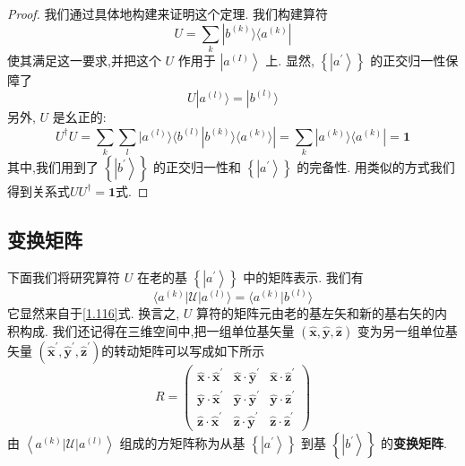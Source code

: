 \documentclass[lang=cn,newtx,10pt,scheme=chinese,thmcnt=section]{elegantbook}
\begin{document}
\begin{proof}
	我们通过具体地构建来证明这个定理. 我们构建算符
	\begin{equation}\label{1.115}
		U = \mathop{\sum }\limits_{k}| {b}^{( k) }\rangle \langle {a}^{( k) }|
	\end{equation}
	使其满足这一要求,并把这个 $U$ 作用于 $\left| {a}^{\left( I\right) }\right\rangle$ 上. 显然, $\left\{ \left| {a}^{\prime }\right\rangle \right\}$ 的正交归一性保障了
	\begin{equation}\label{1.116}
		U| {a}^{( l) }\rangle = | {b}^{( l) }\rangle
	\end{equation}
	另外, $U$ 是幺正的:
	\begin{equation}
		{U}^{ \dagger }U = \mathop{\sum }\limits_{k}\mathop{\sum }\limits_{l}| {a}^{( l) }\rangle \langle {{b}^{( l) }| {{b}^{( k) }\rangle \langle {a}^{( k) }\rangle }| = \mathop{\sum }\limits_{k}| {a}^{( k) }\rangle \langle {a}^{( k) }| = \textbf{1}}
	\end{equation}
	其中,我们用到了 $\left\{ \left| {b}^{\prime }\right\rangle \right\}$ 的正交归一性和 $\left\{ \left| {a}^{\prime }\right\rangle \right\}$ 的完备性. 用类似的方式我们得到关系式$U{U}^{ \dagger } = \textbf{1}$式.
\end{proof}
\subsection*{变换矩阵}
下面我们将研究算符 $U$ 在老的基 $\left\{ \left| {a}^{\prime }\right\rangle \right\}$ 中的矩阵表示. 我们有
\begin{equation}
	\langle {{a}^{\left( k\right) }\left| \mathcal{U}\right| {a}^{\left( l\right) }}\rangle = \langle {{a}^{\left( k\right) } | {b}^{\left( l\right) }}\rangle
\end{equation}
它显然来自于\ref{1.116}式. 换言之, $U$ 算符的矩阵元由老的基左矢和新的基右矢的内积构成. 我们还记得在三维空间中,把一组单位基矢量 $\left( {\widehat{\mathbf{x}},\widehat{\mathbf{y}},\widehat{\mathbf{z}}}\right)$ 变为另一组单位基矢量 $\left( {{\widehat{\mathbf{x}}}^{\prime },{\widehat{\mathbf{y}}}^{\prime },{\widehat{\mathbf{z}}}^{\prime }}\right)$的转动矩阵可以写成如下所示
\begin{equation}
	R = \left( \begin{array}{lll} \widehat{\mathbf{x}} \cdot {\widehat{\mathbf{x}}}^{\prime } & \widehat{\mathbf{x}} \cdot {\widehat{\mathbf{y}}}^{\prime } & \widehat{\mathbf{x}} \cdot {\widehat{\mathbf{z}}}^{\prime } \\ \widehat{\mathbf{y}} \cdot {\widehat{\mathbf{x}}}^{\prime } & \widehat{\mathbf{y}} \cdot {\widehat{\mathbf{y}}}^{\prime } & \widehat{\mathbf{y}} \cdot {\widehat{\mathbf{z}}}^{\prime } \\ \widehat{\mathbf{z}} \cdot {\widehat{\mathbf{x}}}^{\prime } & \widehat{\mathbf{z}} \cdot {\widehat{\mathbf{y}}}^{\prime } & \widehat{\mathbf{z}} \cdot {\widehat{\mathbf{z}}}^{\prime } \end{array}\right)
\end{equation}
由 $\left\langle {{a}^{\left( k\right) }\left| \mathcal{U}\right| {a}^{\left( l\right) }}\right\rangle$ 组成的方矩阵称为从基 $\left\{ \left| {a}^{\prime }\right\rangle \right\}$ 到基 $\left\{ \left| {b}^{\prime }\right\rangle \right\}$ 的\textbf{变换矩阵}.
\end{document}
